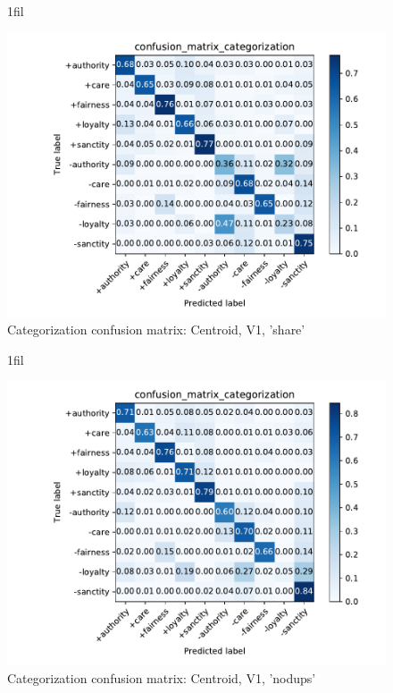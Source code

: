 \documentclass{article}
\makeatletter
\newcommand*{\centerfloat}{%
  \parindent \z@
  \leftskip \z@ \@plus 1fil \@minus \textwidth
  \rightskip\leftskip
  \parfillskip \z@skip}
\makeatother
\begin{document}
\begin{figure}[H]
    \centerfloat
    \caption{Categorization confusion matrix: Centroid, V1, 'share'}
    \includegraphics[width=1.3\linewidth]{../../plots-2/confusion-matrix-centroid-v1-share/confusion_matrix_categorization.pdf}
\end{figure}

\begin{figure}[H]
    \centerfloat
    \caption{Categorization confusion matrix: Centroid, V1, 'nodups'}
    \includegraphics[width=1.3\linewidth]{../../plots-2/confusion-matrix-centroid-v1-nodups/confusion_matrix_categorization.pdf}
\end{figure}
\end{document}
